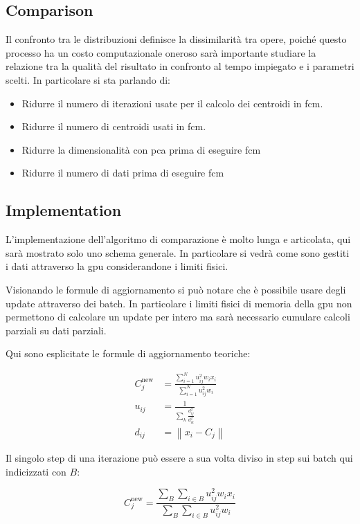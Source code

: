 \begin{toDo}
    \section{Comparison}
    Il confronto tra le distribuzioni definisce la dissimilarità tra opere, poiché questo processo ha un costo computazionale oneroso sarà importante studiare la relazione tra la qualità del risultato in confronto al tempo impiegato e i parametri scelti. In particolare si sta parlando di:
    \begin{itemize}
    	\item Ridurre il numero di iterazioni usate per il calcolo dei centroidi in \gls{fcm}.
    	\item Ridurre il numero di centroidi usati in \gls{fcm}.
    	\item Ridurre la dimensionalità con \gls{pca} prima di eseguire \gls{fcm}
    	\item Ridurre il numero di dati prima di eseguire \gls{fcm}
    \end{itemize}

	\subsection{Implementation}
	L'implementazione dell'algoritmo di comparazione è molto lunga e articolata, qui sarà mostrato solo uno schema generale. In particolare si vedrà come sono gestiti i dati attraverso la \gls{gpu} considerandone i limiti fisici.


	\noindent Visionando le formule di aggiornamento si può notare che è possibile usare degli update attraverso dei batch. In particolare i limiti fisici di memoria della \gls{gpu} non permettono di calcolare un update per intero ma sarà necessario cumulare calcoli parziali su dati parziali.

	\noindent Qui sono esplicitate le formule di aggiornamento teoriche:

	\begin{align*}
		C_{j}^\text{new} &= \frac{\sum_{i=1}^N u_{ij}^2w_ix_i}{\sum_{i=1}^N u_{ij}^2w_i} \\
		u_{ij} &= \frac{1}{\sum_k\frac{d_{ij}^2}{d_{ik}^2}} \\
		d_{ij} &= \left\|x_i - C_{j}\right\|
	\end{align*}

	\noindent Il singolo step di una iterazione può essere a sua volta diviso in step sui batch qui indicizzati con $B$:

	\begin{equation*}
		C_{j}^\text{new} = \frac{\sum_{B}\sum_{i\in B} u_{ij}^2w_ix_i}{\sum_{B}\sum_{i\in B} u_{ij}^2w_i}
	\end{equation*}


\end{toDo}
